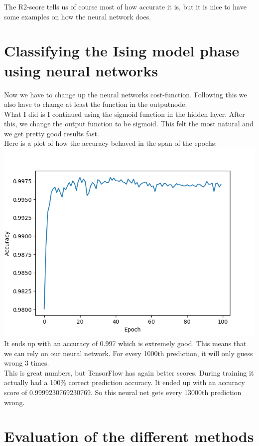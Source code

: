 \documentclass[a4paper,norsk]{article}
\begin{document}
The R2-score tells us of course most of how accurate it is, but it is nice to have some examples on how the neural network does.\\

\clearpage
\section{Classifying the Ising model phase using neural networks}
Now we have to change up the neural networks cost-function. Following this we also have to change at least the function in the outputnode.\\
What I did is I continued using the sigmoid function in the hidden layer. After this, we change the output function to be sigmoid. This felt the most natural and we get pretty good results fast.\\
Here is a plot of how the accuracy behaved in the span of the epochs:\\
\includegraphics[scale=.7]{images/classNN100epoch}\\
It ends up with an accuracy of 0.997 which is extremely good. This means that we can rely on our neural network. For every 1000th prediction, it will only guess wrong 3 times.\\
This is great numbers, but TensorFlow has again better scores. During training it actually had a 100\% correct prediction accuracy. It ended up with an accuracy score of 0.9999230769230769. So this neural net gets every 13000th prediction wrong. 



\clearpage
\section{Evaluation of the different methods}
\end{document}
